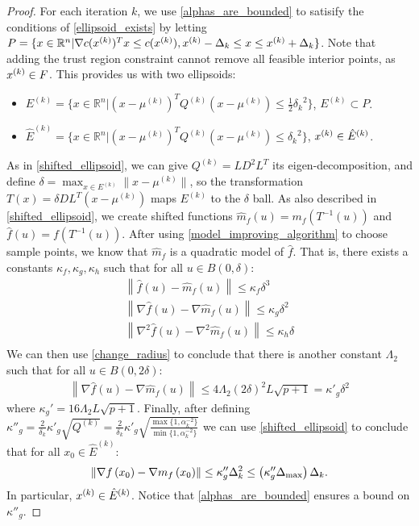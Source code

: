 \begin{proof}
For each iteration $k$, we use \cref{alphas_are_bounded} to satisify the conditions of \cref{ellipsoid_exists} by letting 
$P = \{x \in \mathbb R^n |  \nabla c({x^{(k)}})^T x \le c({x^{(k)}}), {x^{(k)}} - \Delta_k \le x \le {x^{(k)}} + \Delta_k \}$.
Note that adding the trust region constraint cannot remove all feasible interior points, as ${x^{(k)}} \in {F}$.
This provides us with two ellipsoids:
\begin{itemize}
\item $E^{(k)} = \{x \in \mathbb R^n | \left(x - \mu^{(k)}\right)^T Q^{(k)} \left(x - \mu^{(k)}\right) \le \frac 1 2 {\delta_k}^2 \}$, $E^{(k)} \subset P$.
\item $\hat E^{(k)} = \{x \in \mathbb R^n | \left(x - \mu^{(k)}\right)^T Q^{(k)} \left(x - \mu^{(k)}\right) \le {\delta_k}^2 \}$, ${x^{(k)}} \in \hat E^{(k)}$.
\end{itemize}
As in \cref{shifted_ellipsoid}, we can give $Q^{(k)} = LD^2L^T$ its eigen-decomposition, and define $\delta = \max_{x \in E^{(k)}} \|x - \mu^{(k)}\|$, 
so the transformation $T(x) = \delta D L^T(x - \mu^{(k)})$ maps $E^{(k)}$ to the $\delta$ ball.
As also described in \cref{shifted_ellipsoid}, we  create shifted functions
$\hat {m}_f(u) = m_f(T^{-1}(u))$ and
$\hat f (u) = f(T^{-1}(u))$.
After using \cref{model_improving_algorithm} to choose sample points, we know that ${\hat m }_f$ is a quadratic model of $\hat f$.
That is, there exists a constants $\kappa_f, \kappa_g, \kappa_h$ such that for all $u \in B(0, \delta)$:
\begin{align*}
\left\| \hat {f}\left(u\right) -  \hat{m}_f\left(u\right) \right\|\le \kappa_f \delta^3 \\
\left\|\nabla \hat {f}\left(u\right) - \nabla \hat{m}_f\left(u\right) \right\|\le \kappa_g \delta^2 \\
\left\|\nabla^2 \hat {f}\left(u\right) - \nabla^2 \hat{m}_f\left(u\right) \right\|\le \kappa_h \delta \\
\end{align*}
We can then use \cref{change_radius} to conclude that there is another constant $\Lambda_2$ such that for all $u \in B(0, 2\delta)$:
\begin{align*}
\left\|\nabla \hat {f}\left(u\right) - \nabla \hat{m}_f\left(u\right) \right\|\le 4 \Lambda_2 \left(2\delta\right)^2 L \sqrt{p+1} = {\kappa'}_g\delta^2
\end{align*}
where $\kappa_{g}' = 16 \Lambda_2 L \sqrt{p+1}$.
Finally, after defining $\kappa''_{g} =  \frac 2 {\delta_k} \kappa'_g \sqrt{Q^{(k)}} =  \frac 2 {\delta_k}\kappa'_g \sqrt{\frac{\max\{1, \alpha_k^{-2}\}}{\min\{1, \alpha_k^{-2}\}}}$
we can use  \cref{shifted_ellipsoid} to conclude that for all $x_0 \in \hat E^{(k)}$:
\begin{align*}
\left\|\nabla f\left(x_0 \right) - \nabla m_f\left(x_0\right)\right\| \le \kappa''_{g} \Delta_k^2 \le \left(\kappa''_g \Delta_{\text{max}}\right) \Delta_k.
\end{align*}
In particular, ${x^{(k)}} \in \hat E^{(k)}$.
Notice that \cref{alphas_are_bounded} ensures a bound on $\kappa''_g$.

\end{proof}



